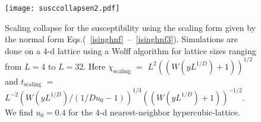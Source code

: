 \documentclass[
 reprint,
 amsmath,amssymb,
 aps, superscriptaddress, pre
]{revtex4-1}
\begin{document}
\begin{figure}
 \texttt{[image: susccollapsen2.pdf]}
 \caption{Scaling collapse for the susceptibility using the scaling form given by the normal form Eqs.(~\ref{isinghnf}~--~\ref{isinghnf3}). Simulations are done on a 4-d lattice using a Wolff algorithm for lattice sizes ranging from $L = 4$ to $L = 32$. Here $\chi_\mathrm{scaling}$ $=$ $L^2 ((W(y L^{1/D}) + 1))^{1/2}$ and $t_{\mathrm{scaling}}$ $=$ $L^{-2} (W(y L^{1/D})/(1/D u_0 - 1))^{1/3} ((W(y L^{1/D})+1))^{-1/2}$. We find $u_0 = 0.4$ for the 4-d nearest-neighbor hypercubic-lattice.}
\label{collapses2}
 \end{figure}




\end{document}
